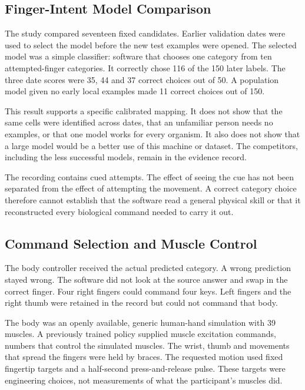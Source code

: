 \subsection{Finger-Intent Model Comparison}

The study compared seventeen fixed candidates. Earlier validation dates were
used to select the model before the new test examples were opened. The selected
model was a simple classifier: software that chooses one category from ten
attempted-finger categories. It correctly chose 116 of the 150 later labels.
The three date scores were 35, 44 and 37 correct choices out of 50. A population
model given no early local examples made 11 correct choices out of 150.

This result supports a specific calibrated mapping. It does not show that the
same cells were identified across dates, that an unfamiliar person needs no
examples, or that one model works for every organism. It also does not show that
a large model would be a better use of this machine or dataset. The competitors,
including the less successful models, remain in the evidence record.

The recording contains cued attempts. The effect of seeing the cue has not been
separated from the effect of attempting the movement. A correct category choice
therefore cannot establish that the software read a general physical skill or
that it reconstructed every biological command needed to carry it out.

\subsection{Command Selection and Muscle Control}

The body controller received the actual predicted category. A wrong prediction
stayed wrong. The software did not look at the source answer and swap in the
correct finger. Four right fingers could command four keys. Left fingers and
the right thumb were retained in the record but could not command that body.

The body was an openly available, generic human-hand simulation with 39 muscles.
A previously trained policy supplied muscle excitation commands, numbers that
control the simulated muscles. The wrist, thumb and movements that spread the
fingers were held by braces. The requested motion used fixed fingertip targets
and a half-second press-and-release pulse. These targets were engineering
choices, not measurements of what the participant's muscles did.

